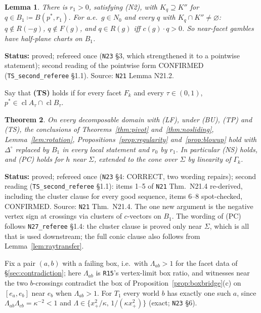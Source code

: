 \documentclass[11pt]{article}
\newtheorem{theorem}{Theorem}[section]
\newtheorem{lemma}[theorem]{Lemma}
\theoremstyle{definition}
\theoremstyle{remark}
\newcommand{\Di}{\Delta^{\circ}}
\newcommand{\cl}{\operatorname{cl}}
\newcommand{\src}[1]{\texttt{#1}}
\newcommand{\status}[1]{\par\smallskip\noindent\textbf{Status:} #1\par\smallskip}
\begin{document}
\begin{lemma}\label{lem:B1}
There is $r_1>0$, satisfying (N2), with $K_q\supseteq K''$ for $q\in B_1\coloneqq B(p^*,r_1)$. For a.e.\ $g\in N_0$ and every $q$ with $K_q\cap K''\ne\varnothing$: $q\notin R(-g)$, $q\notin F(g)$, and $q\in R(g)$ iff $c(g)\cdot q>0$. So near-facet gambles have half-plane charts on $B_1$.
\end{lemma}
\status{proved; refereed once (\src{N23} \S3, which strengthened it to a pointwise statement); second reading of the pointwise form CONFIRMED (\src{TS\_second\_referee} \S1.1). Source: \src{N21} Lemma N21.2.}

Say that \textbf{(TS)} holds if for every facet $F_k$ and every $\tau\in(0,1)$, $p^*\in\cl A_\tau\cap\cl B_\tau$.

\begin{theorem}\label{thm:TS}
On every decomposable domain with (LF), under (BU), (TP) and (TS), the conclusions of Theorems~\ref{thm:pivot} and~\ref{thm:nosliding}, Lemma~\ref{lem:rotation}, Propositions~\ref{prop:regularity} and~\ref{prop:blowup} hold with $\Di$ replaced by $B_1$ in every local statement and $r_0$ by $r_1$. In particular (NS) holds, and (PC) holds for $h$ near $\Sigma$, extended to the cone over $\Sigma$ by linearity of $\Gamma_k$.
\end{theorem}
\status{proved; refereed once (\src{N23} \S4: CORRECT, two wording repairs); second reading (\src{TS\_second\_referee} \S1.1): items 1--5 of \src{N21} Thm.~N21.4 re-derived, including the cluster clause for every good sequence, items 6--8 spot-checked, CONFIRMED. Source: \src{N21} Thm.~N21.4. The one new argument is the negative vertex sign at crossings via clusters of $c$-vectors on $B_1$. The wording of (PC) follows \src{N27\_referee} \S1.4: the cluster clause is proved only near $\Sigma$, which is all that is used downstream; the full conic clause also follows from Lemma~\ref{lem:raytransfer}.}

Fix a pair $(a,b)$ with a failing box, i.e.\ with $\Lambda_{ab}>1$ for the facet data of \S\ref{sec:contradiction}; here $\Lambda_{ab}$ is \src{R15}'s vertex-limit box ratio, and witnesses near the two $b$-crossings contradict the box of Proposition~\ref{prop:boxbridge}(c) on $[e_a,e_b]$ near $e_b$ when $\Lambda_{ab}>1$. For $T_1$ every world $b$ has exactly one such $a$, since $\Lambda_{ab}\Lambda_{cb}=\kappa^{-2}<1$ and $\Lambda\in\{x_+^2/\kappa,\,1/(\kappa x_+^2)\}$ (exact; \src{N23} \S6).
\end{document}
